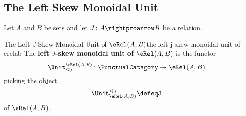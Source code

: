 \subsection{The Left Skew Monoidal Unit}\label{subsection-the-left-skew-monoidal-structure-on-rel-a-b-the-left-skew-monoidal-unit}
Let $A$ and $B$ be sets and let $J\colon A\rightproarrow B$ be a relation.
\begin{definition}{The Left $J$-Skew Monoidal Unit of $\eRel(A,B)$}{the-left-j-skew-monoidal-unit-of-erelab}%
    The \textbf{left $J$-skew monoidal unit of $\eRel(A,B)$} is the functor
    \[
        \Unit^{\eRel(A,B)}_{\lhd_{J}}
        \colon
        \PunctualCategory
        \to
        \eRel(A,B)
    \]
    picking the object
    \[
        \Unit^{\lhd_{J}}_{\eRel(A,B)}%
        \defeq%
        J
    \]%
    of $\eRel(A,B)$.
\end{definition}
